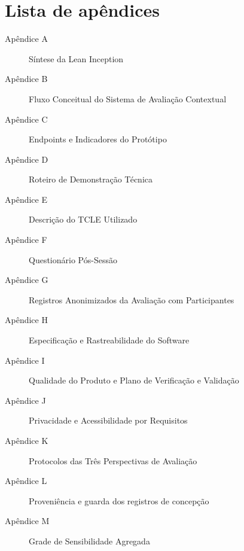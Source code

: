 \chapter*{Lista de apêndices}

\begin{description}
    \item[Apêndice A] Síntese da Lean Inception\dotfill\pageref{ap:A}
    \item[Apêndice B] Fluxo Conceitual do Sistema de Avaliação Contextual\dotfill\pageref{ap:B}
    \item[Apêndice C] Endpoints e Indicadores do Protótipo\dotfill\pageref{ap:C}
    \item[Apêndice D] Roteiro de Demonstração Técnica\dotfill\pageref{ap:D}
    \item[Apêndice E] Descrição do TCLE Utilizado\dotfill\pageref{ap:E}
    \item[Apêndice F] Questionário Pós-Sessão\dotfill\pageref{ap:F}
    \item[Apêndice G] Registros Anonimizados da Avaliação com Participantes\dotfill\pageref{ap:G}
    \item[Apêndice H] Especificação e Rastreabilidade do Software\dotfill\pageref{ap:H}
    \item[Apêndice I] Qualidade do Produto e Plano de Verificação e Validação\dotfill\pageref{ap:I}
    \item[Apêndice J] Privacidade e Acessibilidade por Requisitos\dotfill\pageref{ap:J}
    \item[Apêndice K] Protocolos das Três Perspectivas de Avaliação\dotfill\pageref{ap:K}
    \item[Apêndice L] Proveniência e guarda dos registros de concepção\dotfill\pageref{ap:L}
    \item[Apêndice M] Grade de Sensibilidade Agregada\dotfill\pageref{ap:M}
\end{description}

\cleardoublepage

